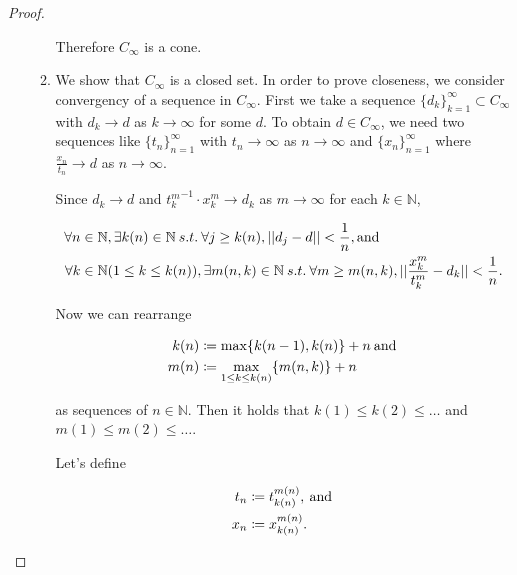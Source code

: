 \documentclass[a4paper,11pt]{jsarticle}
\newcommand{\NaturalNumberSet}{\mathbb{N}}
\begin{document}
\begin{proof}
\begin{enumerate}[label=\roman*,align=CenterWithParen]
\begin{enumerate}[label=i-\alph*,align=CenterWithParen]
        Therefore $C_{\infty}$ is a cone.

        \item We show that $C_{\infty}$ is a closed set. In order to prove closeness, we consider convergency of a sequence in $C_{\infty}$. First we take a sequence $\{d_k\}_{k=1}^{\infty} \subset C_{\infty}$ with $d_k \rightarrow d$ as $k \rightarrow \infty$ for some $d$. To obtain $d \in C_{\infty}$, we need two sequences like $\{t_n\}_{n=1}^{\infty}$ with $t_n \rightarrow \infty$ as $n \rightarrow \infty$ and $\{x_n\}_{n=1}^{\infty}$ where $\frac{x_n}{t_n} \rightarrow d$ as $n \rightarrow \infty$.

        Since $d_k \rightarrow d$ and ${t_k^m}^{-1} \cdot x_k^m \rightarrow d_k$ as $m \rightarrow \infty$ for each $k \in \NaturalNumberSet$,

        \begin{equation}
          \begin{split}
            \forall n &\in \NaturalNumberSet, \exists k(n) \in \NaturalNumberSet \:s.t.\: \forall j \geq k(n), ||d_j -d|| < \frac{1}{n}, \text{and} \\
            \forall k &\in \NaturalNumberSet (1 \leq k \leq k(n)), \exists m(n,k) \in \NaturalNumberSet \:s.t.\: \forall m \geq m(n,k), ||\frac{x_k^m}{t_k^m} -d_k|| < \frac{1}{n}. \notag
          \end{split}
        \end{equation}

        Now we can rearrange

        \begin{equation}
          \begin{split}
          k(n) &\coloneqq \max\{k(n-1),k(n)\} + n \:\text{and}\: \\
          m(n) &\coloneqq \max_{1 \leq k \leq k(n)}\{m(n,k)\} + n \notag
          \end{split}
        \end{equation}

        as sequences of $n \in \NaturalNumberSet$. Then it holds that $k(1) \leq k(2) \leq \ldots$ and $m(1) \leq m(2) \leq \ldots$.

        Let's define

        \begin{equation}
          \begin{split}
            t_n &\coloneqq t_{k(n)}^{m(n)}, \:\text{and}\: \\
            x_n &\coloneqq x_{k(n)}^{m(n)}. \notag
          \end{split}
        \end{equation}


\end{enumerate}
\end{enumerate}
\end{proof}
\end{document}
